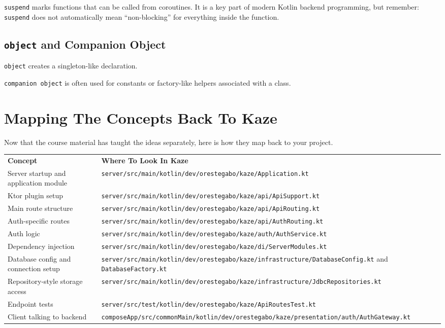 \documentclass[11pt,a4paper]{article}
\begin{document}
\texttt{suspend} marks functions that can be called from coroutines. It is a key part of modern Kotlin backend programming, but remember: \texttt{suspend} does not automatically mean ``non-blocking'' for everything inside the function.

\subsection{\texttt{object} and Companion Object}

\texttt{object} creates a singleton-like declaration.

\texttt{companion object} is often used for constants or factory-like helpers associated with a class.

\section{Mapping The Concepts Back To Kaze}

Now that the course material has taught the ideas separately, here is how they map back to your project.

\begin{longtable}{p{} p{}}
\textbf{Concept} & \textbf{Where To Look In Kaze} \\
Server startup and application module & \texttt{server/src/main/kotlin/dev/orestegabo/kaze/Application.kt} \\
Ktor plugin setup & \texttt{server/src/main/kotlin/dev/orestegabo/kaze/api/ApiSupport.kt} \\
Main route structure & \texttt{server/src/main/kotlin/dev/orestegabo/kaze/api/ApiRouting.kt} \\
Auth-specific routes & \texttt{server/src/main/kotlin/dev/orestegabo/kaze/api/AuthRouting.kt} \\
Auth logic & \texttt{server/src/main/kotlin/dev/orestegabo/kaze/auth/AuthService.kt} \\
Dependency injection & \texttt{server/src/main/kotlin/dev/orestegabo/kaze/di/ServerModules.kt} \\
Database config and connection setup & \texttt{server/src/main/kotlin/dev/orestegabo/kaze/infrastructure/DatabaseConfig.kt} and \texttt{DatabaseFactory.kt} \\
Repository-style storage access & \texttt{server/src/main/kotlin/dev/orestegabo/kaze/infrastructure/JdbcRepositories.kt} \\
Endpoint tests & \texttt{server/src/test/kotlin/dev/orestegabo/kaze/ApiRoutesTest.kt} \\
Client talking to backend & \texttt{composeApp/src/commonMain/kotlin/dev/orestegabo/kaze/presentation/auth/AuthGateway.kt} \\
\end{longtable}
\end{document}

